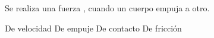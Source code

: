 
\question Se realiza una fuerza \fillin \enspace, cuando un cuerpo empuja
          a otro.

  \begin{oneparchoices}
    \choice De velocidad
    \choice De empuje
    \CorrectChoice De contacto
    \choice De fricción
  \end{oneparchoices}
  \answerline[C]
